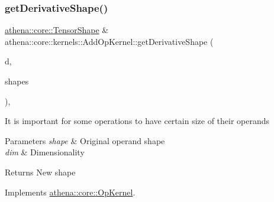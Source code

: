 \mbox{\label{classathena_1_1core_1_1kernels_1_1_add_op_kernel_a873ce3dc366c72f651331d91dd48be0a}} 
\subsubsection{\texorpdfstring{get\+Derivative\+Shape()}{getDerivativeShape()}}
{\footnotesize\ttfamily \mbox{\hyperlink{classathena_1_1core_1_1_tensor_shape}{athena\+::core\+::\+Tensor\+Shape}} \& athena\+::core\+::kernels\+::\+Add\+Op\+Kernel\+::get\+Derivative\+Shape (\begin{DoxyParamCaption}\item[{int}]{d,  }\item[{const std\+::vector$<$ \mbox{\hyperlink{classathena_1_1core_1_1_tensor_shape}{athena\+::core\+::\+Tensor\+Shape}} \& $>$ \&}]{shapes }\end{DoxyParamCaption})\hspace{0.3cm}{\ttfamily [override]}, {\ttfamily [virtual]}}

It is important for some operations to have certain size of their operands 
\begin{DoxyParams}{Parameters}
{\em shape} & Original operand shape \\
\hline
{\em dim} & Dimensionality \\
\hline
\end{DoxyParams}
\begin{DoxyReturn}{Returns}
New shape 
\end{DoxyReturn}


Implements \mbox{\hyperlink{classathena_1_1core_1_1_op_kernel_aa2367d955810d4e0f3f27b85ae6fe85a}{athena\+::core\+::\+Op\+Kernel}}.

\mbox{\label{classathena_1_1core_1_1kernels_1_1_add_op_kernel_a296a0c69a7b906037324cce2b64827e1}} 
